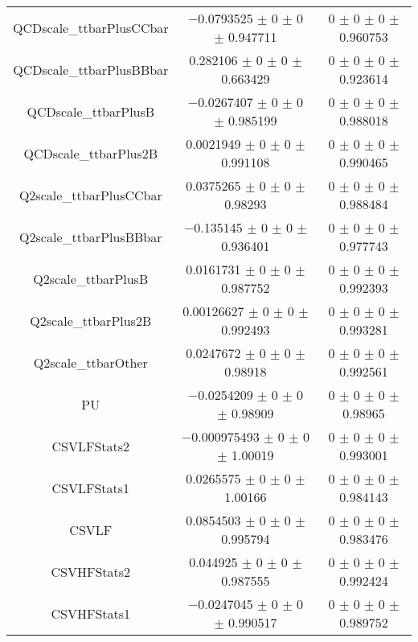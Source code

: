 \begin{table}
\begin{tabular}{ccc}
QCDscale\_ttbarPlusCCbar & \num{-0.0793525} $\pm$ \num{0} $\pm$ \num{0} $\pm$ \num{0.947711} & \num{0} $\pm$ \num{0} $\pm$ \num{0} $\pm$ \num{0.960753}\\
QCDscale\_ttbarPlusBBbar & \num{0.282106} $\pm$ \num{0} $\pm$ \num{0} $\pm$ \num{0.663429} & \num{0} $\pm$ \num{0} $\pm$ \num{0} $\pm$ \num{0.923614}\\
QCDscale\_ttbarPlusB & \num{-0.0267407} $\pm$ \num{0} $\pm$ \num{0} $\pm$ \num{0.985199} & \num{0} $\pm$ \num{0} $\pm$ \num{0} $\pm$ \num{0.988018}\\
QCDscale\_ttbarPlus2B & \num{0.0021949} $\pm$ \num{0} $\pm$ \num{0} $\pm$ \num{0.991108} & \num{0} $\pm$ \num{0} $\pm$ \num{0} $\pm$ \num{0.990465}\\
Q2scale\_ttbarPlusCCbar & \num{0.0375265} $\pm$ \num{0} $\pm$ \num{0} $\pm$ \num{0.98293} & \num{0} $\pm$ \num{0} $\pm$ \num{0} $\pm$ \num{0.988484}\\
Q2scale\_ttbarPlusBBbar & \num{-0.135145} $\pm$ \num{0} $\pm$ \num{0} $\pm$ \num{0.936401} & \num{0} $\pm$ \num{0} $\pm$ \num{0} $\pm$ \num{0.977743}\\
Q2scale\_ttbarPlusB & \num{0.0161731} $\pm$ \num{0} $\pm$ \num{0} $\pm$ \num{0.987752} & \num{0} $\pm$ \num{0} $\pm$ \num{0} $\pm$ \num{0.992393}\\
Q2scale\_ttbarPlus2B & \num{0.00126627} $\pm$ \num{0} $\pm$ \num{0} $\pm$ \num{0.992493} & \num{0} $\pm$ \num{0} $\pm$ \num{0} $\pm$ \num{0.993281}\\
Q2scale\_ttbarOther & \num{0.0247672} $\pm$ \num{0} $\pm$ \num{0} $\pm$ \num{0.98918} & \num{0} $\pm$ \num{0} $\pm$ \num{0} $\pm$ \num{0.992561}\\
PU & \num{-0.0254209} $\pm$ \num{0} $\pm$ \num{0} $\pm$ \num{0.98909} & \num{0} $\pm$ \num{0} $\pm$ \num{0} $\pm$ \num{0.98965}\\
CSVLFStats2 & \num{-0.000975493} $\pm$ \num{0} $\pm$ \num{0} $\pm$ \num{1.00019} & \num{0} $\pm$ \num{0} $\pm$ \num{0} $\pm$ \num{0.993001}\\
CSVLFStats1 & \num{0.0265575} $\pm$ \num{0} $\pm$ \num{0} $\pm$ \num{1.00166} & \num{0} $\pm$ \num{0} $\pm$ \num{0} $\pm$ \num{0.984143}\\
CSVLF & \num{0.0854503} $\pm$ \num{0} $\pm$ \num{0} $\pm$ \num{0.995794} & \num{0} $\pm$ \num{0} $\pm$ \num{0} $\pm$ \num{0.983476}\\
CSVHFStats2 & \num{0.044925} $\pm$ \num{0} $\pm$ \num{0} $\pm$ \num{0.987555} & \num{0} $\pm$ \num{0} $\pm$ \num{0} $\pm$ \num{0.992424}\\
CSVHFStats1 & \num{-0.0247045} $\pm$ \num{0} $\pm$ \num{0} $\pm$ \num{0.990517} & \num{0} $\pm$ \num{0} $\pm$ \num{0} $\pm$ \num{0.989752}\\

\end{tabular}
\end{table}
